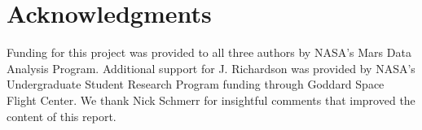 \section{Acknowledgments}

Funding for this project was provided to all three authors by NASA's Mars Data Analysis Program. Additional support for J. Richardson was provided by NASA's Undergraduate Student Research Program funding through Goddard Space Flight Center. We thank Nick Schmerr for insightful comments that improved the content of this report.



% 

